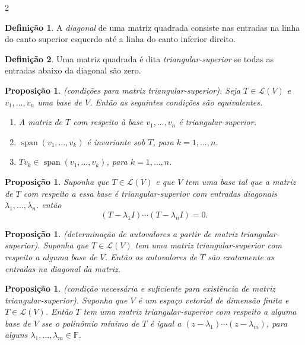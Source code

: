 \documentclass{article}
\theoremstyle{plain}
\newtheorem{prop}[thm]{Proposição}
\theoremstyle{definition}
\newtheorem{defn}{Definição}[section]
\theoremstyle{remark}
\DeclareMathOperator{\spn}{span}
\begin{document}
\begin{multicols}{2}
\begin{defn}
    A \emph{diagonal} de uma matriz quadrada consiste nas entradas na linha do canto superior esquerdo até a linha do canto inferior direito.
\end{defn}

\begin{defn}
    Uma matriz quadrada é dita \emph{triangular-superior} se todas as entradas abaixo da diagonal são zero.
\end{defn}

\begin{prop} (condições para matriz triangular-superior).
    Seja \(T \in \mathcal{L}(V)\) e \(v_1, \ldots, v_n\) uma base de \(V\). Então as seguintes condições são equivalentes.
    \begin{enumerate}
        \item[\textup{(a)}] A matriz de \(T\) com respeito à base \(v_1, \ldots, v_n\) é triangular-superior.
        \item[\textup{(b)}] \(\spn(v_1, \ldots, v_k)\) é invariante sob \(T\), para \(k = 1, \ldots, n\).
        \item[\textup{(c)}] \(Tv_k \in \spn(v_1, \ldots, v_k)\), para \(k = 1, \ldots, n\).
    \end{enumerate}
\end{prop}

\begin{prop}
    Suponha que \(T \in \mathcal{L}(V)\) e que \(V\) tem uma base tal que a matriz de \(T\) com respeito a essa base é triangular-superior com entradas diagonais \(\lambda_1, \ldots, \lambda_n\). então
    \[
        (T - \lambda_1I)\cdots(T - \lambda_n I) = 0.
    \]
\end{prop}

\begin{prop} (determinação de autovalores a partir de matriz triangular-superior).
    Suponha que \(T \in \mathcal{L}(V)\) tem uma matriz triangular-superior com respeito a alguma base de \(V\). Então os autovalores de \(T\) são exatamente as entradas na diagonal da matriz.
\end{prop}

\begin{prop} (condição necessária e suficiente para existência de matriz triangular-superior).
    Suponha que \(V\) é um espaço vetorial de dimensão finita e \(T \in \mathcal{L}(V)\). Então \(T\) tem uma matriz triangular-superior com respeito a alguma base de \(V\) sse o polinômio mínimo de \(T\) é igual a \((z - \lambda_1) \cdots (z - \lambda_m)\), para alguns \(\lambda_1, \ldots, \lambda_m \in \mathbb{F}\).
\end{prop}


\end{multicols}
\end{document}
